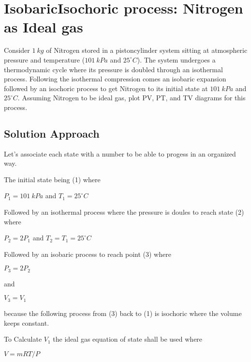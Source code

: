 \documentclass[letterpaper,10pt,english]{jupyterBook}
\begin{document}
\sphinxstepscope


\section{Isobaric\sphinxhyphen{}Isochoric process: Nitrogen as Ideal gas}
\label{\detokenize{notebooks/Chapter3/CH3-Q4_v1:isobaric-isochoric-process-nitrogen-as-ideal-gas}}\label{\detokenize{notebooks/Chapter3/CH3-Q4_v1::doc}}
\sphinxAtStartPar
Consider \(1\:kg\) of Nitrogen stored in a piston\sphinxhyphen{}cylinder system sitting at atmospheric pressure and temperature (\(101\:kPa\) and \(25 ^{\circ}  C\)). The system undergoes a thermodynamic cycle where its pressure is doubled through an isothermal process. Following the isothermal compression comes an isobaric expansion followed by an isochoric process to get Nitrogen to its initial state at \(101\:kPa\) and \(25 ^{\circ}  C\). Assuming Nitrogen to be ideal gas, plot P\sphinxhyphen{}V, P\sphinxhyphen{}T, and T\sphinxhyphen{}V diagrams for this process.


\subsection{Solution Approach}
\label{\detokenize{notebooks/Chapter3/CH3-Q4_v1:solution-approach}}
\sphinxAtStartPar
Let’s associate each state with a number to be able to progess in an organized way.

\sphinxAtStartPar
The initial state being (1) where

\sphinxAtStartPar
\(P_1=101\:kPa\) and \(T_1=25^{\circ}  C\)

\sphinxAtStartPar
Followed by an isothermal process where the pressure is doules to reach state (2) where

\sphinxAtStartPar
\(P_2=2P_1\) and \(T_2=T_1=25^{\circ}  C\)

\sphinxAtStartPar
Followed by an isobaric process to reach point (3) where

\sphinxAtStartPar
\(P_3=2P_2\)

\sphinxAtStartPar
and

\sphinxAtStartPar
\(V_3=V_1\)

\sphinxAtStartPar
because the following process from (3) back to (1) is isochoric where the volume keeps constant.

\sphinxAtStartPar
To Calculate \(V_1\) the ideal gas equation of state shall be used where

\sphinxAtStartPar
\(V=mRT/P\)
\end{document}
